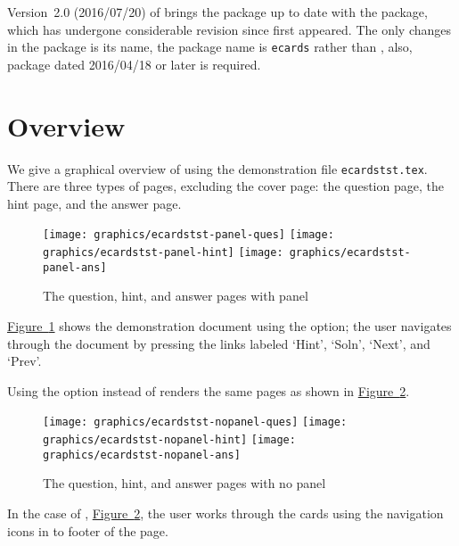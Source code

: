\documentclass{article}
\begin{document}
Version~2.0 (2016/07/20) of  brings the package up to date with
the  package, which has undergone considerable revision since
 first appeared. The only changes in the package is its name, the
package name is \texttt{ecards} rather than , also,
 package dated 2016/04/18 or later is required.

\section{Overview}

We give a graphical overview of  using the demonstration file
\texttt{ecardstst.tex}. There are three types of pages, excluding the cover
page: the question page, the hint page, and the answer page.

\begin{figure}[htb]
\hskip-62.5pt\begin{minipage}{\linewidth+62.5pt}
\centering
\texttt{[image: graphics/ecardstst-panel-ques]}\hfill
\texttt{[image: graphics/ecardstst-panel-hint]}\hfill
\texttt{[image: graphics/ecardstst-panel-ans]}\hfill
  \caption{The question, hint, and answer pages with panel}\label{fig:ecards-pan}
\end{minipage}
\end{figure}

\hyperref[fig:ecards-pan]{Figure~\ref*{fig:ecards-pan}} shows the demonstration document using the
 option; the user navigates through the document by pressing
the links labeled `Hint', `Soln', `Next', and `Prev'.

Using the  option instead of  renders the
same pages as shown in \hyperref[fig:ecards-nopan]{Figure~\ref*{fig:ecards-nopan}}.

\begin{figure}[htb]
\hskip-62.5pt\begin{minipage}{\linewidth+62.5pt}
\centering
\texttt{[image: graphics/ecardstst-nopanel-ques]}\hfill
\texttt{[image: graphics/ecardstst-nopanel-hint]}\hfill
\texttt{[image: graphics/ecardstst-nopanel-ans]}\hfill
  \caption{The question, hint, and answer pages with no panel}\label{fig:ecards-nopan}
\end{minipage}
\end{figure}

In the case of ,
\hyperref[fig:ecards-nopan]{Figure~\ref*{fig:ecards-nopan}}, the user works
through the cards using the navigation icons in to footer of the page.
\end{document}
